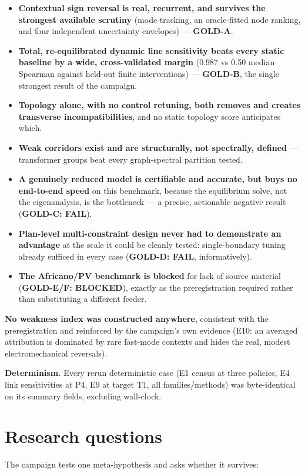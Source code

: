 \documentclass[10pt,a4paper]{article}
\begin{document}
\begin{itemize}
\item \textbf{Contextual sign reversal is real, recurrent, and survives the strongest available scrutiny} (mode tracking, an oracle-fitted node ranking, and four independent uncertainty envelopes) — \textbf{GOLD-A}.
\item \textbf{Total, re-equilibrated dynamic line sensitivity beats every static baseline by a wide, cross-validated margin} (0.987 vs 0.50 median Spearman against held-out finite interventions) — \textbf{GOLD-B}, the single strongest result of the campaign.
\item \textbf{Topology alone, with no control retuning, both removes and creates transverse incompatibilities}, and no static topology score anticipates which.
\item \textbf{Weak corridors exist and are structurally, not spectrally, defined} — transformer groups beat every graph-spectral partition tested.
\item \textbf{A genuinely reduced model is certifiable and accurate, but buys no end-to-end speed} on this benchmark, because the equilibrium solve, not the eigenanalysis, is the bottleneck — a precise, actionable negative result (\textbf{GOLD-C: FAIL}).
\item \textbf{Plan-level multi-constraint design never had to demonstrate an advantage} at the scale it could be cleanly tested: single-boundary tuning already sufficed in every case (\textbf{GOLD-D: FAIL}, informatively).
\item \textbf{The Africano/PV benchmark is blocked} for lack of source material (\textbf{GOLD-E/F: BLOCKED}), exactly as the preregistration required rather than substituting a different feeder.
\end{itemize}
\textbf{No weakness index was constructed anywhere}, consistent with the preregistration and reinforced by the campaign's own evidence (E10: an averaged attribution is dominated by rare fast-mode contexts and hides the real, modest electromechanical reversals).

\textbf{Determinism.} Every rerun deterministic case (E1 census at three policies, E4 link sensitivities at P4, E9 at target T1, all families/methods) was byte-identical on its summary fields, excluding wall-clock.

\section{Research questions}
The campaign tests one meta-hypothesis and asks whether it survives:
\end{document}
